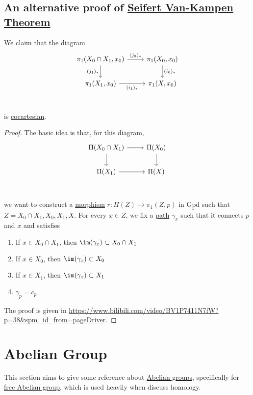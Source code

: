 \subsection{An alternative proof of \hyperref[thm:Seifert-Van-Kampen-Theorem]{Seifert Van-Kampen Theorem}}\label{pf:an-alternative-proof-of-Seifert-Van-Kampen-thm}
\begin{theorem}
	We claim that the diagram
	\[
		\begin{tikzcd}
			{\pi_1(X_0\cap X_1, x_0)} & {\pi_1(X_0, x_0)} \\
			{\pi_1(X_1, x_0)} & {\pi_1(X, x_0)} \\
			\arrow["{(j_0)_\ast}", from=1-1, to=1-2]
			\arrow["{(i_0)_\ast}", from=1-2, to=2-2]
			\arrow["{(i_1)_\ast}"', from=2-1, to=2-2]
			\arrow["{(j_1)_\ast}"', from=1-1, to=2-1]
		\end{tikzcd}
	\]
	is \hyperref[def:cocartesian]{cocartesian}.
\end{theorem}
\begin{proof}
	The basic idea is that, for this diagram,
	\[\begin{tikzcd}
			{\Pi(X_0\cap X_1)} & {\Pi(X_0)} \\
			{\Pi(X_1)} & {\Pi(X)} \\
			\arrow[from=1-1, to=1-2]
			\arrow[from=1-2, to=2-2]
			\arrow[from=2-1, to=2-2]
			\arrow[from=1-1, to=2-1]
		\end{tikzcd}\]
	we want to construct a \hyperref[def:morphism]{morphism} \(r\colon \Pi (Z)\to \pi _1(Z, p)\) in \(\underline{\mathrm{Gpd}}\) such that
	\(Z = X_0 \cap X_1, X_0, X_1, X\). For every \(x\in Z\), we fix a \hyperref[def:path]{path} \(\gamma _{x} \) such that it connects \(p\) and \(x\) and satisfies
	\begin{enumerate}
		\item If \(x\in X_0 \cap X_1\), then \(\im  (\gamma _{x} )\subset X_0 \cap X_1\)
		\item If \(x\in X_0\), then \(\im  (\gamma _{x} )\subset X_0\)
		\item If \(x\in X_1\), then \(\im  (\gamma _{x} )\subset X_1\)
		\item \(\gamma _p = c_p\)
	\end{enumerate}

	The proof is given in \url{https://www.bilibili.com/video/BV1P7411N7fW?p=38&spm_id_from=pageDriver}.
\end{proof}

\section{Abelian Group}
This section aims to give some reference about \hyperref[def:Abelian-group]{Abelian groups}, specifically for \hyperref[def:free-Abelian-group]{free Abelian group}, which is used
heavily when discuss homology.
